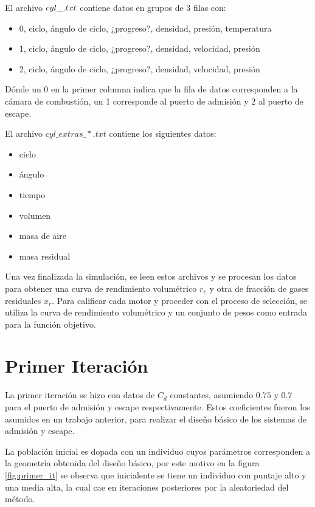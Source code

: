 El archivo \emph{$cyl\_\*.txt$} contiene datos en grupos de 3 filas con:

\begin{itemize}
        \item 0, ciclo, ángulo de ciclo, ¿progreso?, densidad, presión, temperatura
        \item 1, ciclo, ángulo de ciclo, ¿progreso?, densidad, velocidad, presión
        \item 2, ciclo, ángulo de ciclo, ¿progreso?, densidad, velocidad, presión
\end{itemize}

Dónde un 0 en la primer columna indica que la fila de datos corresponden a la
cámara de combustión, un 1 corresponde al puerto de admisión y 2 al puerto de
escape.

El archivo \emph{$cyl\_extras\_*.txt$} contiene los siguientes datos:
\begin{itemize}
  \item ciclo
  \item ángulo
  \item tiempo
  \item volumen
  \item masa de aire
  \item masa residual
\end{itemize}

Una vez finalizada la simulación, se leen estos archivos y se procesan los datos
para obtener una curva de rendimiento volumétrico $r_{v}$ y otra de fracción de
gases residuales $x_{r}$.
%
Para calificar cada motor y proceder con el proceso de selección, se utiliza la
curva de rendimiento volumétrico y un conjunto de pesos como entrada para la
función objetivo.


\section{Primer Iteración}

La primer iteración se hizo con datos de $C_{d}$ constantes, asumiendo $0.75$ y
$0.7$ para el puerto de admisión y escape respectivamente.
%
Estos coeficientes fueron los asumidos en un trabajo anterior\cite{lopez13},
para realizar el diseño básico de los sistemas de admisión y escape.

La población inicial es dopada con un individuo cuyos parámetros corresponden a
la geometría obtenida del diseño básico\cite{lopez13}, por este motivo en la
figura \ref{fig:primer_it} se observa que inicialente se tiene un individuo con
puntaje alto y una media alta, la cual cae en iteraciones posteriores por la
aleatoriedad del método.

